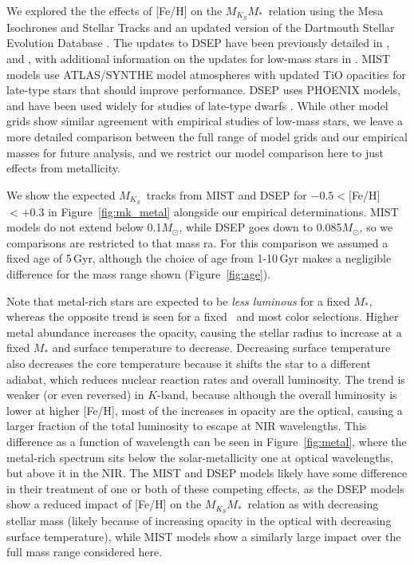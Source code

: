\documentclass[twocolumn]{aastex62}
\newcommand{\mks}{$M_{K_S}$}
\newcommand{\mmk}{$M_{K_S}$\textendash$M_*$}
\begin{document}
We explored the the effects of [Fe/H] on the \mmk\ relation using the Mesa Isochrones and Stellar Tracks \citep[MIST,][]{MIST0,MIST1} and an updated version of the Dartmouth Stellar Evolution Database \citep[DSEP,][]{Dotter2008}. The updates to DSEP have been previously detailed in \citet{Feiden2013,Feiden2014a}, and \citet{Muirhead2014}, with additional information on the updates for low-mass stars in \citet{Mann2015b}. MIST models use ATLAS/SYNTHE model atmospheres \citep{2004astro.ph..5087C} with updated TiO opacities for late-type stars that should improve performance. DSEP uses PHOENIX \cite{Hauschildt1999,1999ApJ...525..871H} models, and have been used widely for studies of late-type dwarfs \citep[e.g.,][]{Boyajian2012,2015MNRAS.454..593B,2018arXiv180404133K}. While other model grids \citep[e.g.,YaPSI, PARSEC, Lyon][]{Spada2013,Chen2014,BHAC15} show similar agreement with empirical studies of low-mass stars, we leave a more detailed comparison between the full range of model grids and our empirical masses for future analysis, and we restrict our model comparison here to just effects from metallicity. 

We show the expected \mks\ tracks from MIST and DSEP for $-0.5<$[Fe/H]$<+0.3$ in Figure~\ref{fig:mk_metal} alongside our empirical determinations. MIST models do not extend below 0.1$M_\odot$, while DSEP goes down to 0.085$M_\odot$, so we comparisons are restricted to that mass ra. For this comparison we assumed a fixed age of 5\,Gyr, although the choice of age from 1-10\,Gyr makes a negligible difference for the mass range shown (Figure~\ref{fig:age}). 

Note that metal-rich stars are expected to be {\it less luminous} for a fixed $M_*$, whereas the opposite trend is seen for a fixed \teff\ and most color selections. Higher metal abundance increases the opacity, causing the stellar radius to increase at a fixed $M_*$ and surface temperature to decrease. Decreasing surface temperature also decreases the core temperature because it shifts the star to a different adiabat, which reduces nuclear reaction rates and overall luminosity. The trend is weaker (or even reversed) in $K$-band, because although the overall luminosity is lower at higher [Fe/H], most of the increases in opacity are the optical, causing a larger fraction of the total luminosity to escape at NIR wavelengths. This difference as a function of wavelength can be seen in Figure~\ref{fig:metal}, where the metal-rich spectrum sits below the solar-metallicity one at optical wavelengths, but above it in the NIR. The MIST and DSEP models likely have some difference in their treatment of one or both of these competing effects, as the DSEP models show a reduced impact of [Fe/H] on the \mmk\ relation as with decreasing stellar mass (likely because of increasing opacity in the optical with decreasing surface temperature), while MIST models show a similarly large impact over the full mass range considered here. 
\end{document}
